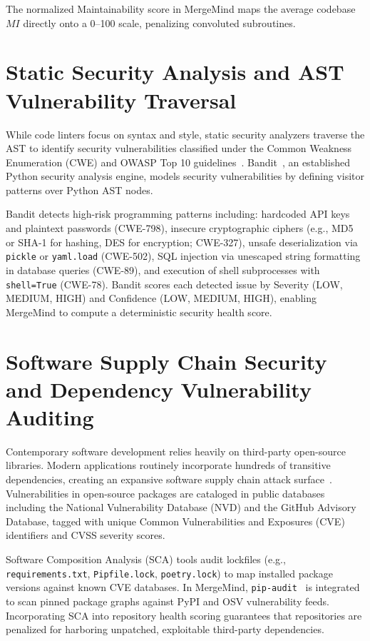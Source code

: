 \documentclass[12pt,a4paper,oneside]{report}
\begin{document}
The normalized Maintainability score in MergeMind maps the average codebase $MI$ directly onto a 0--100 scale, penalizing convoluted subroutines.

\section{Static Security Analysis and AST Vulnerability Traversal}
\label{sec:lit-security-sast}

While code linters focus on syntax and style, static security analyzers traverse the AST to identify security vulnerabilities classified under the Common Weakness Enumeration (CWE) and OWASP Top 10 guidelines~\cite{owasp2021top10}. Bandit~\cite{sembiring2022implementation,paul2021survey}, an established Python security analysis engine, models security vulnerabilities by defining visitor patterns over Python AST nodes.

Bandit detects high-risk programming patterns including: hardcoded API keys and plaintext passwords (CWE-798), insecure cryptographic ciphers (e.g., MD5 or SHA-1 for hashing, DES for encryption; CWE-327), unsafe deserialization via \texttt{pickle} or \texttt{yaml.load} (CWE-502), SQL injection via unescaped string formatting in database queries (CWE-89), and execution of shell subprocesses with \texttt{shell=True} (CWE-78). Bandit scores each detected issue by Severity (LOW, MEDIUM, HIGH) and Confidence (LOW, MEDIUM, HIGH), enabling MergeMind to compute a deterministic security health score.

\section{Software Supply Chain Security and Dependency Vulnerability Auditing}
\label{sec:lit-supply-chain}

Contemporary software development relies heavily on third-party open-source libraries. Modern applications routinely incorporate hundreds of transitive dependencies, creating an expansive software supply chain attack surface~\cite{srikant2022software}. Vulnerabilities in open-source packages are cataloged in public databases including the National Vulnerability Database (NVD) and the GitHub Advisory Database, tagged with unique Common Vulnerabilities and Exposures (CVE) identifiers and CVSS severity scores.

Software Composition Analysis (SCA) tools audit lockfiles (e.g., \texttt{requirements.txt}, \texttt{Pipfile.lock}, \texttt{poetry.lock}) to map installed package versions against known CVE databases. In MergeMind, \texttt{pip-audit}~\cite{trailofbits2024pipaudit} is integrated to scan pinned package graphs against PyPI and OSV vulnerability feeds. Incorporating SCA into repository health scoring guarantees that repositories are penalized for harboring unpatched, exploitable third-party dependencies.
\end{document}
